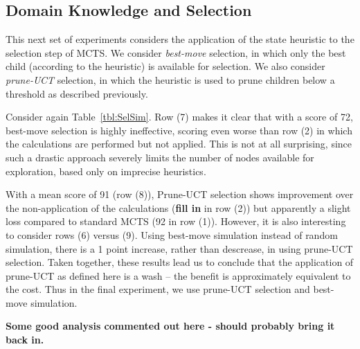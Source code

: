\documentclass[letterpaper]{article}
\begin{document}
\subsection{Domain Knowledge and Selection}

%

This next set of experiments considers the application of the state heuristic to the selection step of MCTS. We consider {\it best-move} selection, in which only the best child (according to the heuristic) is available for selection. We also consider {\it prune-UCT} selection, in which the heuristic is used to prune children below a threshold as described previously.

Consider again Table~\ref{tbl:SelSim}. Row (7) makes it clear that with a score of 72, best-move selection is highly ineffective, scoring even worse than row (2) in which the calculations are performed but not applied. This is not at all surprising, since such a drastic approach severely limits the number of nodes available for exploration, based only on imprecise heuristics.

With a mean score of 91 (row (8)), Prune-UCT selection shows improvement over the non-application of the calculations ({\bf fill in} in row (2)) but apparently a slight loss compared to standard MCTS (92 in row (1)). However, it is also interesting to consider rows (6) versus (9). Using best-move simulation instead of random simulation, there is a 1 point increase, rather than descrease, in using prune-UCT selection. Taken together, these results lead us to conclude that the application of prune-UCT as defined here is a wash -- the benefit is approximately equivalent to the cost. Thus in the final experiment, we use prune-UCT selection and best-move simulation.

{\bf Some good analysis commented out here - should probably bring it back in.}
\end{document}
